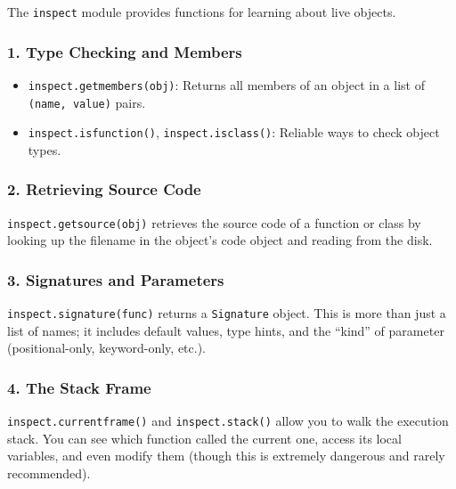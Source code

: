 The \passthrough{\lstinline!inspect!} module provides functions for
learning about live objects.

\hypertarget{type-checking-and-members}{%
\subsubsection{1. Type Checking and
Members}\label{type-checking-and-members}}

\begin{itemize}
\tightlist
\item
  \passthrough{\lstinline!inspect.getmembers(obj)!}: Returns all members
  of an object in a list of \passthrough{\lstinline!(name, value)!}
  pairs.
\item
  \passthrough{\lstinline!inspect.isfunction()!},
  \passthrough{\lstinline!inspect.isclass()!}: Reliable ways to check
  object types.
\end{itemize}

\hypertarget{retrieving-source-code}{%
\subsubsection{2. Retrieving Source Code}\label{retrieving-source-code}}

\passthrough{\lstinline!inspect.getsource(obj)!} retrieves the source
code of a function or class by looking up the filename in the object's
code object and reading from the disk.

\hypertarget{signatures-and-parameters}{%
\subsubsection{3. Signatures and
Parameters}\label{signatures-and-parameters}}

\passthrough{\lstinline!inspect.signature(func)!} returns a
\passthrough{\lstinline!Signature!} object. This is more than just a
list of names; it includes default values, type hints, and the ``kind''
of parameter (positional-only, keyword-only, etc.).

\hypertarget{the-stack-frame}{%
\subsubsection{4. The Stack Frame}\label{the-stack-frame}}

\passthrough{\lstinline!inspect.currentframe()!} and
\passthrough{\lstinline!inspect.stack()!} allow you to walk the
execution stack. You can see which function called the current one,
access its local variables, and even modify them (though this is
extremely dangerous and rarely recommended).

